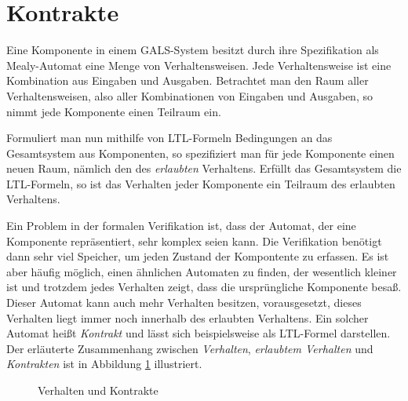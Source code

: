 \section{Kontrakte}
\label{sec:contracts}
Eine Komponente in einem GALS-System besitzt durch ihre Spezifikation als Mealy-Automat eine Menge von Verhaltensweisen.
Jede Verhaltensweise ist eine Kombination aus Eingaben und Ausgaben.
Betrachtet man den Raum aller Verhaltensweisen, also aller Kombinationen von Eingaben und Ausgaben, so nimmt jede Komponente einen Teilraum ein.

Formuliert man nun mithilfe von LTL-Formeln Bedingungen an das Gesamtsystem aus Komponenten, so spezifiziert man für jede Komponente einen neuen Raum, nämlich den des \emph{erlaubten} Verhaltens.
Erfüllt das Gesamtsystem die LTL-Formeln, so ist das Verhalten jeder Komponente ein Teilraum des erlaubten Verhaltens.

Ein Problem in der formalen Verifikation ist, dass der Automat, der eine Komponente repräsentiert, sehr komplex seien kann.
Die Verifikation benötigt dann sehr viel Speicher, um jeden Zustand der Kompontente zu erfassen.
Es ist aber häufig möglich, einen ähnlichen Automaten zu finden, der wesentlich kleiner ist und trotzdem jedes Verhalten zeigt, dass die ursprüngliche Komponente besaß.
Dieser Automat kann auch mehr Verhalten besitzen, vorausgesetzt, dieses Verhalten liegt immer noch innerhalb des erlaubten Verhaltens.
Ein solcher Automat heißt \emph{Kontrakt} und lässt sich beispielsweise als LTL-Formel darstellen.
Der erläuterte Zusammenhang zwischen \emph{Verhalten}, \emph{erlaubtem Verhalten} und \emph{Kontrakten} ist in Abbildung \ref{fig:contracts} illustriert.
\begin{figure}[h]
  \centering
  \caption{Verhalten und Kontrakte}
  \label{fig:contracts}
\end{figure}


